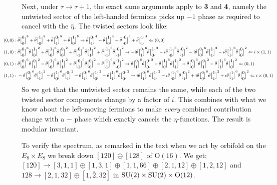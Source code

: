 \documentclass[11pt, class=article, crop=false]{standalone}
\begin{document}
\begin{enumerate}
	Next, under $\tau \to \tau+1$, the exact same arguments apply to \textbf{3} and \textbf{4}, namely the untwisted sector of the left-handed fermions picks up $-1$ phase as required to cancel with the $\bar \eta$. The twisted sectors look like:
	\[
		\footnotesize
		\hspace{-.5in}
		\begin{aligned}
			(0,0):\;&  \bar \theta\twist00^8 + \bar \theta\twist10^8 + \bar \theta\twist01^8 + \bar \theta\twist10^8 \to \bar \theta\twist01^4 + \bar \theta\twist10^4 + \bar \theta\twist00^4 +\bar \theta\twist11^4 \Leftarrow (0,0)
			\\
			(1,0):\;& \bar \theta\twist00^6 \bar \theta \twist10^2 + \bar \theta\twist10^6 \bar \theta \twist 00^2 + \bar\theta \twist01^6  \bar \theta \twist11^2 + \bar \theta \twist11^6 \bar \theta\twist01^2 \to -i \bar \theta\twist01^6 \bar \theta \twist10^2 - i \bar \theta\twist10^6 \bar \theta \twist 01^2 - i \bar\theta \twist00^6  \bar \theta \twist11^2 - i \bar \theta \twist11^6 \bar \theta\twist00^2  \Leftarrow i \times (1,1) 
			\\
			(0,1):\;&  \bar \theta\twist00^6 \bar \theta \twist01^2 
			- \bar \theta\twist10^6 \bar \theta \twist 11^2
			+ \bar\theta \twist01^6  \bar \theta \twist00^2 
			- \bar \theta \twist11^6 \bar \theta\twist10^2 
			\to  \bar \theta\twist01^6 \bar \theta \twist00^2 
			- \bar \theta\twist10^6 \bar \theta \twist 11^2 
			+ \bar\theta \twist00^6  \bar \theta \twist01^2 
			- \bar \theta \twist11^6 \bar \theta\twist10^2  \Leftarrow  (0,1)
			\\
			(1,1):\;&  - \bar \theta\twist00^6 \bar \theta \twist11^2 - \bar \theta\twist10^6 \bar \theta \twist 01^2 
			- \bar\theta \twist01^6  \bar \theta \twist10^2 
			- \bar \theta \twist11^6 \bar \theta\twist00^2 
			\to i \bar \theta\twist01^6 \bar \theta \twist11^2 
			+i \bar \theta\twist10^6 \bar \theta \twist 01^2 
			+ i \bar\theta \twist00^6  \bar \theta \twist11^2 
			+ i \bar \theta \twist11^6 \bar \theta\twist00^2  \Leftarrow i \times (0,1) 
		\end{aligned}
	\]
	So we get that the untwisted sector remains the same, while each of the two twisted sector components change by a factor of $i$. This combines with what we know about the left-moving fermions to make \emph{every} combined contribution change with a $-$ phase which exactly cancels the $\eta$-functions. The result is modular invariant.
	
	To verify the spectrum, as remarked in the text when we act by orbifold on the $E_8 \times E_8$ we break down $[120]\oplus [128]$ of $\mathrm O(16)$. We get: $[120] \to [3,1,1] \oplus [1,3,1] \oplus [1,1,66] \oplus [2,1,12] \oplus [1,2,12]$ and $128 \to [2,1,32] \oplus [1,\bar 2, 32]$ in $\mathrm{SU}(2) \times \mathrm{SU}(2) \times \mathrm O(12)$.
	

\end{enumerate}
\end{document}
